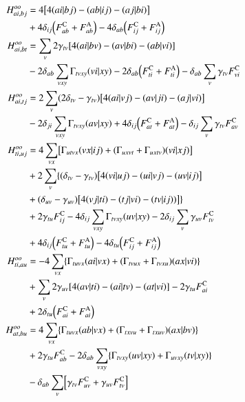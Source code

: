 \documentclass[aip,jcp,reprint,noshowkeys,superscriptaddress]{revtex4-1}
\begin{document}
\begin{subequations}
\begin{align}
  H^{oo}_{ai,bj} &= 4\mleft[ 4\ceri{ai}{bj}-\ceri{ab}{ij}-\ceri{aj}{bi} \mright] \\
  &+ 4 \delta_{ij} \mleft( \FC{ab}+\FA{ab} \mright) - 4 \delta_{ab}\mleft(\FC{ij}+\FA{ij}\mright) \notag \\
  H^{oo}_{ai,bt} &= \sum_{v} 2\gamma_{tv}\mleft[4\ceri{ai}{bv}-\ceri{av}{bi}-\ceri{ab}{vi}\mright] \\
  &- 2\delta_{ab}\sum_{vxy} \Gamma_{tvxy}\ceri{vi}{xy} - 2 \delta_{ab}\mleft(\FC{ti}+\FA{ti}\mright) - \delta_{ab}\sum_v\gamma_{tv}\FC{vi} \notag \\
  H^{oo}_{ai,tj} &= 2 \sum_v (2\delta_{tv} - \gamma_{tv})\mleft[4\ceri{ai}{vj}-\ceri{av}{ji}-\ceri{aj}{vi}\mright] \\*
               &- 2\delta_{ji}\sum_{vxy} \Gamma_{tvxy}\ceri{av}{xy} + 4\delta_{ij}\mleft(\FC{at}+\FA{at}\mright) - \delta_{ij}\sum_v\gamma_{tv}\FC{av}\notag \\ 
  H^{oo}_{ti,uj} &= 4\sum_{vx}\mleft[\Gamma_{utvx}\ceri{vx}{ij}+(\Gamma_{uxvt}+\Gamma_{uxtv})\ceri{vi}{xj}\mright] \\
                 &+ 2\sum_v\{(\delta_{tv}-\gamma_{tv})\mleft[4\ceri{vi}{uj}-\ceri{ui}{vj}-\ceri{uv}{ij}\mright] \notag \\
  &+(\delta_{uv}-\gamma_{uv})\mleft[4\ceri{vj}{ti}-\ceri{tj}{vi}-\ceri{tv}{ij})\mright]\} \notag \\
                 &+2\gamma_{tu}\FC{ij}-4\delta_{ij}\sum_{vxy}\Gamma_{tvxy}\ceri{uv}{xy}-2\delta_{ij}\sum_v\gamma_{uv}\FC{tv} \notag \\
  &+ 4\delta_{ij}\mleft(\FC{tu}+\FA{tu}\mright)-4\delta_{tu}\mleft(\FC{ij}+\FA{ij}\mright) \notag \\
  H^{oo}_{ti,au} &= -4 \sum_{vx}\{\Gamma_{tuvx}\ceri{ai}{vx} + (\Gamma_{tvux}+\Gamma_{tvxu})\ceri{ax}{vi}\} \\
                 &+ \sum_v2\gamma_{uv}\mleft[4\ceri{av}{ti}-\ceri{ai}{tv}-\ceri{at}{vi}\mright] -2\gamma_{tu}\FC{ai} \notag \\
  &+2\delta_{tu}\mleft(\FC{ai}+\FA{ai}\mright) \notag \\
  H^{oo}_{at,bu} &= 4\sum_{vx}\{\Gamma_{tuvx}\ceri{ab}{vx} + (\Gamma_{txvu}+\Gamma_{txuv})\ceri{ax}{bv}\} \\
                 &+ 2\gamma_{tu}\FC{ab} \notag -2\delta_{ab}\sum_{vxy}\{\Gamma_{tvxy}\ceri{uv}{xy}+\Gamma_{uvxy}\ceri{tv}{xy}\} \notag \\
  &-\delta_{ab}\sum_v\mleft[\gamma_{tv}\FC{uv}+\gamma_{uv}\FC{tv}\mright] \notag
\end{align}
\end{subequations}
\end{document}
